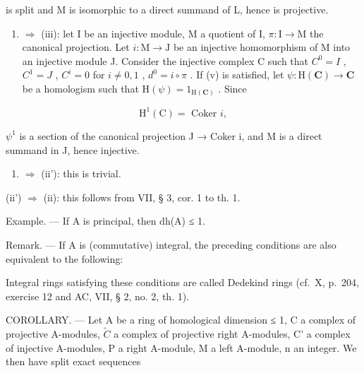 is split and M is isomorphic to a direct summand of L, hence is projective.

\begin{enumerate}
\def\labelenumi{(\alph{enumi})}
\setcounter{enumi}{21}
\tightlist
\item
  \(\Rightarrow\) (iii): let I be an injective module, M a quotient of I, \(\pi : \mathrm{I} \to \mathrm{M}\) the canonical projection. Let \(i: \mathrm{M} \to \mathrm{J}\) be an injective homomorphism of M into an injective module J. Consider the injective complex C such that \(C^0 = I\) , \(C^1 = J\) , \(C^i = 0\) for \(i \neq 0, 1\) , \(d^0 = i \circ \pi\) . If (v) is satisfied, let \(\psi : \mathrm{H}(\mathbf{C}) \to \mathbf{C}\) be a homologism such that \(\mathrm{H}(\psi) = 1_{\mathrm{H}(\mathbf{C})}\) . Since
\end{enumerate}

\[
\mathrm{H} ^ {1} (\mathrm{C}) = \text { Coker } i  ,
\]

\(\psi^{1}\) is a section of the canonical projection J → Coker i, and M is a direct summand in J, hence injective.

\begin{enumerate}
\def\labelenumi{(\roman{enumi})}
\setcounter{enumi}{1}
\tightlist
\item
  \(\Rightarrow\) (ii'): this is trivial.
\end{enumerate}

(ii') \(\Rightarrow\) (ii): this follows from VII, § 3, cor. 1 to th. 1.

Example. --- If A is principal, then dh(A) ≤ 1.

Remark. --- If A is (commutative) integral, the preceding conditions are also equivalent to the following:

Integral rings satisfying these conditions are called Dedekind rings (cf.~X, p.~204, exercise 12 and AC, VII, § 2, no. 2, th. 1).

COROLLARY. --- Let A be a ring of homological dimension ≤ 1, C a complex of projective A-modules, \(\tilde{C}\) a complex of projective right A-modules, C' a complex of injective A-modules, P a right A-module, M a left A-module, n an integer. We then have split exact sequences

